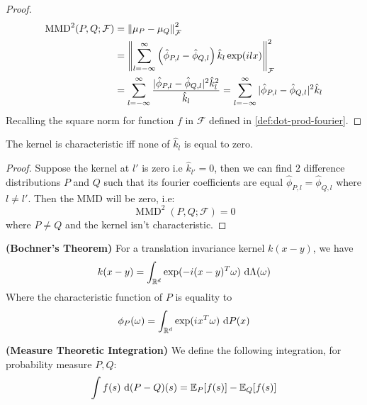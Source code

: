 \begin{proof}
    \begin{equation*}
    \begin{aligned}
        \operatorname{MMD}^2(P, Q; \mathcal{F}) &= \left\lVert\mu_P - \mu_Q\right\rVert_\mathcal{F}^2 \\ 
        &= \left\lVert\sum^\infty_{l=-\infty} \left( \hat{\phi}_{P, l} - \hat{\phi}_{Q, l} \right)\hat{k}_l\exp(ilx) \right\rVert_\mathcal{F}^2 \\
        &= \sum^\infty_{l=-\infty} \frac{|\hat{\phi}_{P, l} - \hat{\phi}_{Q, l}|^2\hat{k}_l^2}{\hat{k}_l} = \sum^\infty_{l=-\infty}|\hat{\phi}_{P, l} - \hat{\phi}_{Q, l}|^2\hat{k}_l
    \end{aligned}
    \end{equation*}
    Recalling the square norm for function $f$ in $\mathcal{F}$ defined in \ref{def:dot-prod-fourier}.
\end{proof}

\begin{corollary}
    The kernel is characteristic iff none of $\hat{k}_l$ is equal to zero.
\end{corollary}
\begin{proof}
    Suppose the kernel at $l'$ is zero i.e $\hat{k}_{l'} = 0$, then
    we can find $2$ difference distributions $P$ and $Q$ such that its fourier coefficients are equal $\hat{\phi}_{P, l} = \hat{\phi}_{Q, l}$ where $l \ne l'$. Then the MMD will be zero, i.e: 
    \begin{equation*}
        \operatorname{MMD}^2(P, Q;\mathcal{F}) = 0
    \end{equation*}
    where $P\ne Q$ and the kernel isn't characteristic. 
\end{proof}

\begin{theorem}{\textbf{(Bochner's Theorem)}}
    For a translation invariance kernel $k(x - y)$, we have 
    \begin{equation*}
        k(x-y) = \int_{\mathbb{R}^d}\exp(-i(x-y)^T\omega)\ \mathrm{d}\Lambda(\omega)
    \end{equation*}
    Where the characteristic function of $P$ is equality to
    \begin{equation*}
        \phi_P(\omega) = \int_{\mathbb{R}^d}\exp(ix^T\omega)\ \mathrm{d} P(x)
    \end{equation*}
\end{theorem}

\begin{definition}{\textbf{(Measure Theoretic Integration)}}
    We define the following integration, for probability measure $P, Q$:
    \begin{equation*}
        \int f(s) \ \mathrm{d}(P-Q)(s) = \mathbb{E}_{P}[f(s)] - \mathbb{E}_Q[f(s)]
    \end{equation*}
\end{definition}


